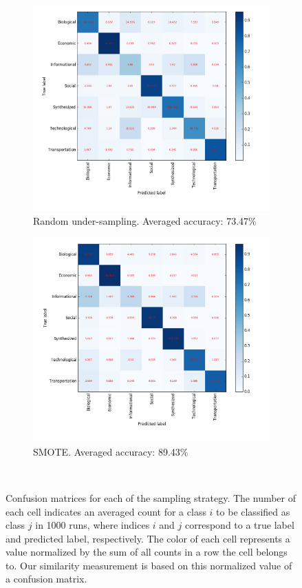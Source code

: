 \documentclass{article}
\begin{document}
\begin{figure}[H]
\medskip
\begin{subfigure}{0.48\textwidth}
\includegraphics[width=\linewidth]{figs/similarity/Domain/RandomUnder_26/confusion.png}
\caption{Random under-sampling. Averaged accuracy: 73.47\%} \label{random_under_confusion}
\end{subfigure}\hspace*{\fill}
\begin{subfigure}{0.48\textwidth}
\includegraphics[width=\linewidth]{figs/similarity/Domain/SMOTE/confusion.png}
\caption{SMOTE. Averaged accuracy: 89.43\%} \label{smote_confusion}
\end{subfigure}
\
\caption{Confusion matrices for each of the sampling strategy. The number of each cell indicates an averaged count for a class $i$ to be classified as class $j$ in 1000 runs, where indices $i$ and $j$ correspond to a true label and predicted label, respectively. The color of each cell represents a value normalized by the sum of all counts in a row the cell belongs to. Our similarity measurement is based on this normalized value of a confusion matrix.} \label{confusion}
\end{figure}
\end{document}
